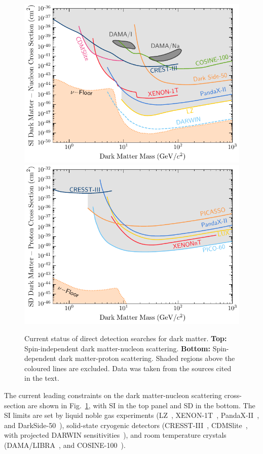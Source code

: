 \begin{figure}
    \centering
    \includegraphics{DM_limits_SI.pdf}
    \includegraphics{DM_limits_SD_p.pdf}
    \caption{Current status of direct detection searches for dark matter. \textbf{Top:} Spin-independent dark matter-nucleon scattering. \textbf{Bottom:} Spin-dependent dark matter-proton scattering. Shaded regions above the coloured lines are excluded. Data was taken from the sources cited in the text.}
    \label{ch1:fig:direct_detection_lims}
\end{figure}

The current leading constraints on the dark matter-nucleon scattering cross-section
are shown in Fig.~\ref{ch1:fig:direct_detection_lims}, with SI in the top panel and SD in the bottom.
The SI limits are set by liquid noble gas experiments (LZ~\cite{LZ:2022lsv_jul_FirstDarkMatter}, 
XENON-1T~\cite{XENON:2020gfr_mar_SearchCoherentElastic}, PandaX-II~\cite{PandaX-4T:2021bab_dec_DarkMatterSearch},
and DarkSide-50~\cite{DarkSide:2022dhx_mar_SearchDarkMatterNucleon}), solid-state cryogenic detectors (CRESST-III~\cite{CRESST:2019jnq_nov_FirstresultsCRESSTIII}, CDMSlite~\cite{SuperCDMS:2023sql_jun_SearchLowmassDark}, with projected DARWIN sensitivities~\cite{Aalbers:2022dzr_dec_Nextgenerationliquidxenon}), 
and room temperature crystals (DAMA/LIBRA~\cite{Savage:2008er_CompatibilityDAMALIBRA}, and COSINE-100~\cite{COSINE-100:2021xqn_nov_StrongconstraintsCOSINE100}). 

